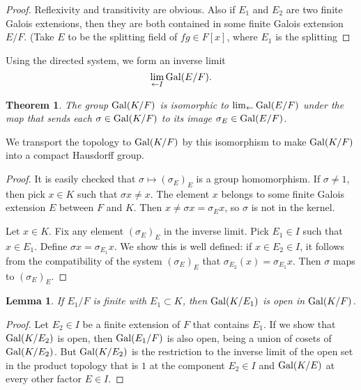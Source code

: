 \documentclass{amsart}
\newtheorem{theorem}[equation]{Theorem}
\newtheorem{lemma}[equation]{Lemma}
\def\oG{\op{Gal}}
\begin{document}
\begin{proof}  Reflexivity and transitivity are obvious.  Also if $E_1$ and
$E_2$ are two finite Galois extensions, then they are both contained in
some finite Galois extension $E/F$.  (Take $E$ to be the splitting field
of $fg\in F[x]$, where $E_1$ is the splitting 
\end{proof}

Using the directed system, we form an inverse limit
\[
\lim_{\leftarrow I} \oG(E/F).
\]

\begin{theorem} The group $\oG(K/F)$ is isomorphic to $\lim_{\leftarrow}\oG(E/F)$
under the map that sends each $\sigma\in\oG(K/F)$ to its image $\sigma_E\in \oG(E/F)$.
\end{theorem}

We transport the topology to $\oG(K/F)$ by this isomorphism to make $\oG(K/F)$ into a compact Hausdorff group.

\begin{proof} It is easily checked that $\sigma\mapsto (\sigma_E)_E$ is a group homomorphism.
  If $\sigma\ne1$, then pick $x\in K$ such
that $\sigma x\ne x$.  The element $x$ belongs to some finite Galois extension $E$ between
$F$ and $K$.  Then $x\ne \sigma x = \sigma_E x$, so $\sigma$ is not in the kernel.

  Let $x\in K$.  Fix any element
$(\sigma_E)_E$ in the inverse limit.  Pick $E_1\in I$ such that $x\in E_1$.
Define $\sigma x = \sigma_{E_1} x$.  We show this is well defined: 
if $x\in {E_2}\in I$, it follows from the compatibility
of the system $(\sigma_E)_E$ that $\sigma_{E_2}(x) = \sigma_{E_1}x$.  Then $\sigma$
maps to $(\sigma_E)_E$.
\end{proof}

\begin{lemma}  If $E_1/F$ is finite with $E_1\subset K$,
then $\oG(K/E_1)$ is open in $\oG(K/F)$.
\end{lemma}

\begin{proof}  Let $E_2\in I$ be a finite extension of $F$ that contains $E_1$.  If we show
that $\oG(K/E_2)$ is open, then $\oG(E_1/F)$ is also open, being a union
of cosets of $\oG(K/E_2)$.  But $\oG(K/E_2)$ is the restriction to the
inverse limit of the open set in the product topology that is ${1}$ at the
component $E_2\in I$ and $\oG(K/E)$ at every other factor $E\in I$.
\end{proof}
\end{document}
